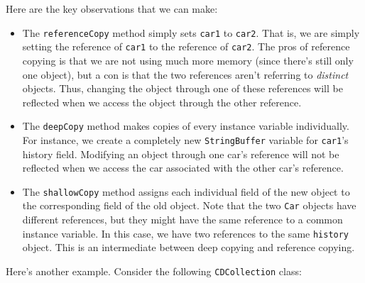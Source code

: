 Here are the key observations that we can make:

\begin{itemize}
    \item The \verb!referenceCopy! method simply sets \verb!car1! to \verb!car2!. That is, we are simply setting the reference of \verb!car1! to the reference of \verb!car2!. The pros of reference copying is that we are not using much more memory (since there's still only one object), but a con is that the two references aren't referring to \textit{distinct} objects. Thus, changing the object through one of these references will be reflected when we access the object through the other reference.
    \item The \verb!deepCopy! method makes copies of every instance variable individually. For instance, we create a completely new \verb!StringBuffer! variable for \verb!car1!'s history field. Modifying an object through one car's reference will not be reflected when we access the car associated with the other car's reference. 
    \item The \verb!shallowCopy! method assigns each individual field of the new object to the corresponding field of the old object. Note that the two \verb!Car! objects have different references, but they might have the same reference to a common instance variable. In this case, we have two references to the same \verb!history! object. This is an intermediate between deep copying and reference copying. 
\end{itemize}

Here's another example. Consider the following \verb!CDCollection! class:

